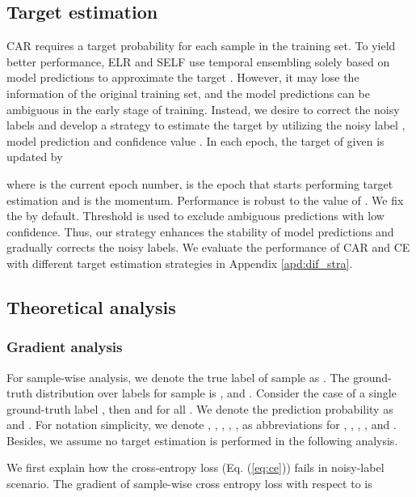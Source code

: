 \documentclass{article}
\begin{document}
\subsection{Target estimation}
\label{sec:target}
CAR requires a target probability  for each sample in the training set. To yield better performance, ELR \cite{liu2020early} and SELF \cite{nguyen2020self} use temporal ensembling \cite{laine2016temporal} solely based on model predictions to approximate the target . However, it may lose the information of the original training set, and the model predictions can be ambiguous in the early stage of training. Instead, we desire to correct the noisy labels and develop a strategy to estimate the target by utilizing the noisy label , model prediction  and confidence value . In each epoch, the target  of given  is updated by

where  is the current epoch number,  is the epoch that starts performing target estimation and  is the momentum. Performance is robust to the value of . We fix the  by default. Threshold  is used to exclude ambiguous predictions with low confidence. Thus, our strategy enhances the stability of model predictions and gradually corrects the noisy labels. We evaluate the performance of CAR and CE with different target estimation strategies in Appendix \ref{apd:dif_stra}.





\subsection{Theoretical analysis}
\label{sec:theore}

\subsubsection{Gradient analysis}
\label{sec:grad_analysis}
For sample-wise analysis, we denote the true label of sample  as . The ground-truth distribution over labels for sample  is , and . Consider the case of a single ground-truth label , then  and  for all . We denote the prediction probability as  and . For notation simplicity, we denote , , , , ,  as abbreviations for , , , ,  and . Besides, we assume no target estimation is performed in the following analysis.

We first explain how the cross-entropy loss  (Eq. (\ref{eq:ce})) fails in noisy-label scenario. The gradient of sample-wise cross entropy loss  with respect to  is 
\end{document}
